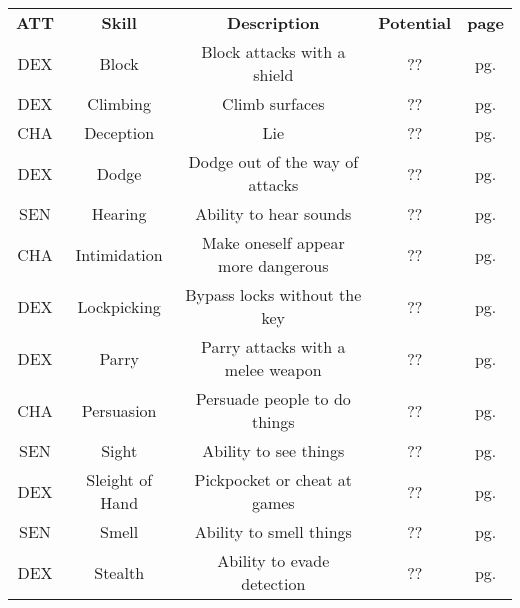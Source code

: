 


\begin{table}[h!]
    \begin{tabular}{c c c c c}
        \bfseries{ATT} & \bfseries{Skill} & \bfseries{Description} & \bfseries{Potential} & \bfseries{page} \\
        DEX & Block & Block attacks with a shield & ?? & pg. \pageref{skill:block} \\
        DEX & Climbing & Climb surfaces & ?? & pg. \pageref{skill:climbing} \\
        CHA & Deception & Lie & ?? & pg. \pageref{skill:deception} \\
        DEX & Dodge & Dodge out of the way of attacks & ?? & pg. \pageref{skill:dodge} \\
        SEN & Hearing & Ability to hear sounds & ?? & pg. \pageref{skill:hearing} \\
        CHA & Intimidation & Make oneself appear more dangerous & ?? & pg. \pageref{skill:intimidation} \\
        DEX & Lockpicking & Bypass locks without the key & ?? & pg. \pageref{skill:lockpicking} \\
        DEX & Parry & Parry attacks with a melee weapon & ?? & pg. \pageref{skill:parry} \\
        CHA & Persuasion & Persuade people to do things & ?? & pg. \pageref{skill:persuasion} \\
        SEN & Sight & Ability to see things & ?? & pg. \pageref{skill:sight} \\
        DEX & Sleight of Hand & Pickpocket or cheat at games & ?? & pg. \pageref{skill:sleight-of-hand} \\
        SEN & Smell & Ability to smell things & ?? & pg. \pageref{skill:smell} \\
        DEX & Stealth & Ability to evade detection & ?? & pg. \pageref{skill:stealth} \\
    \end{tabular}
    \label{tab:general-skills}
\end{table}


